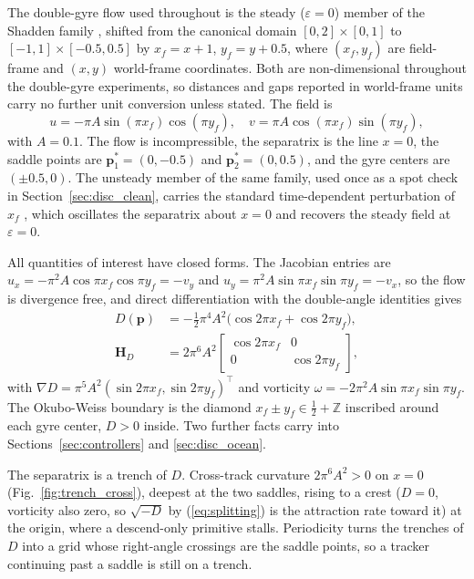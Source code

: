 \documentclass[lettersize,journal]{IEEEtran}
\begin{document}
The double-gyre flow used throughout is the steady ($\varepsilon = 0$)
member of the Shadden family \cite{11}, shifted from the canonical domain
$[0,2] \times [0,1]$ to $[-1,1] \times [-0.5, 0.5]$ by
$x_f = x + 1$, $y_f = y + 0.5$, where $(x_f, y_f)$ are field-frame and
$(x, y)$ world-frame coordinates. Both are non-dimensional throughout the
double-gyre experiments, so distances and gaps reported in world-frame
units carry no further unit conversion unless stated. The field is
\begin{equation}
    u = -\pi A \sin(\pi x_f) \cos(\pi y_f), \quad
    v = \pi A \cos(\pi x_f) \sin(\pi y_f),
    \label{eq:dg_u}
\end{equation}
with $A = 0.1$. The flow is incompressible, the separatrix is the line
$x = 0$, the saddle points are $\mathbf{p}^*_1 = (0, -0.5)$ and
$\mathbf{p}^*_2 = (0, 0.5)$, and the gyre centers are $(\pm 0.5, 0)$.
The unsteady member of the same family, used once as a spot check in
Section~\ref{sec:disc_clean}, carries the standard time-dependent
perturbation of $x_f$ \cite{11}, which oscillates the separatrix about
$x = 0$ and recovers the steady field at $\varepsilon = 0$.

All quantities of interest have closed forms. The Jacobian entries are
$u_x = -\pi^2 A \cos\pi x_f \cos\pi y_f = -v_y$ and
$u_y = \pi^2 A \sin\pi x_f \sin\pi y_f = -v_x$, so the flow is divergence
free, and direct differentiation with the double-angle
identities gives
\begin{equation}
    \begin{aligned}
    D(\mathbf{p}) &= -\tfrac{1}{2}\pi^4 A^2
        \bigl(\cos 2\pi x_f + \cos 2\pi y_f\bigr), \\
    \mathbf{H}_D &= 2\pi^6 A^2
        \begin{bmatrix} \cos 2\pi x_f & 0 \\ 0 & \cos 2\pi y_f \end{bmatrix},
    \end{aligned}
    \label{eq:det_analytic_main}
\end{equation}
with $\nabla D = \pi^5 A^2 (\sin 2\pi x_f, \sin 2\pi y_f)^\top$ and
vorticity $\omega = -2\pi^2 A \sin\pi x_f \sin\pi y_f$. The
Okubo-Weiss boundary is the diamond $x_f \pm y_f \in \tfrac{1}{2} +
\mathbb{Z}$ inscribed around each gyre center, $D > 0$ inside. Two
further facts carry into Sections~\ref{sec:controllers} and
\ref{sec:disc_ocean}.

The separatrix is a trench of $D$. Cross-track curvature
$2\pi^6 A^2 > 0$ on $x = 0$ (Fig.~\ref{fig:trench_cross}), deepest at
the two saddles, rising to a crest ($D = 0$, vorticity also zero, so
$\sqrt{-D}$ by (\ref{eq:splitting}) is the attraction rate toward it)
at the origin, where a descend-only primitive stalls. Periodicity
turns the trenches of $D$ into a grid whose right-angle crossings
are the saddle points, so a tracker continuing past a saddle is still
on a trench.
\end{document}
